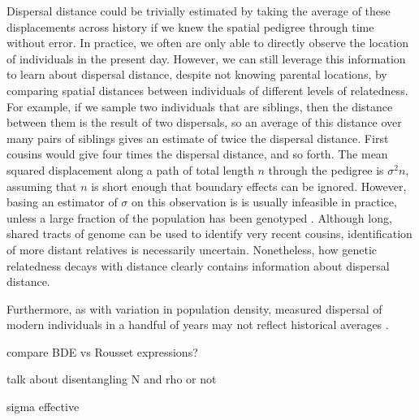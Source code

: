 \documentclass{ar-1col}
\newcommand{\plr}[1]{{\color{green}{#1}}}
\begin{document}
Dispersal distance could be trivially estimated by taking
the average of these displacements across history
if we knew the spatial pedigree through time without error.
In practice, we often are only able to directly observe
the location of individuals in the present day.
However, we can still leverage this information to learn about dispersal distance,
despite not knowing parental locations, 
by comparing spatial distances between individuals of different levels of relatedness.
For example, if we sample two individuals that are siblings,
then the distance between them is the result of two dispersals,
so an average of this distance over many pairs of siblings 
gives an estimate of twice the dispersal distance.
First cousins would give four times the dispersal distance, and so forth.
The mean squared displacement along
a path of total length $n$ through the pedigree is $\sigma^2 n$,
assuming that $n$ is short enough that boundary effects can be ignored.
However, basing an estimator of $\sigma$ on this observation
is is usually infeasible in practice,
unless a large fraction of the population has been genotyped
\citep[e.g.,][]{Aguillon2017deconstructing}.
Although long, shared tracts of genome can be used to identify very recent cousins,
identification of more distant relatives is necessarily uncertain.
Nonetheless, how genetic relatedness decays with distance
clearly contains information about dispersal distance.

Furthermore, as with variation in population density,
measured dispersal of modern individuals in a handful of years
may not reflect historical averages \citep{WhitlockMcCauley1999}.

compare BDE vs Rousset expressions?

talk about disentangling N and rho or not

sigma effective



\end{document}
